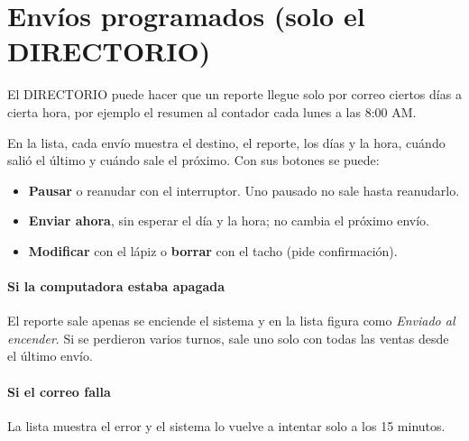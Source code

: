 \section{Envíos programados (solo el DIRECTORIO)}

El DIRECTORIO puede hacer que un reporte llegue solo por correo ciertos días a cierta hora, por ejemplo el resumen al contador cada lunes a las 8:00 AM.



En la lista, cada envío muestra el destino, el reporte, los días y la hora, cuándo salió el último y cuándo sale el próximo. Con sus botones se puede:

\begin{itemize}
  \item \textbf{Pausar} o reanudar con el interruptor. Uno pausado no sale hasta reanudarlo.
  \item \textbf{Enviar ahora}, sin esperar el día y la hora; no cambia el próximo envío.
  \item \textbf{Modificar} con el lápiz o \textbf{borrar} con el tacho (pide confirmación).
\end{itemize}

\paragraph{Si la computadora estaba apagada} El reporte sale apenas se enciende el sistema y en la lista figura como \textit{Enviado al encender}. Si se perdieron varios turnos, sale uno solo con todas las ventas desde el último envío.

\paragraph{Si el correo falla} La lista muestra el error y el sistema lo vuelve a intentar solo a los 15 minutos.
